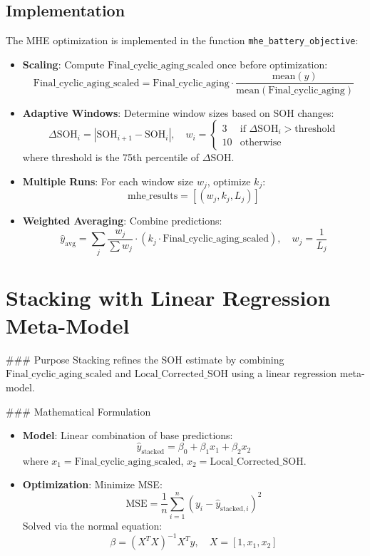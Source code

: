 \subsection{Implementation}
The MHE optimization is implemented in the function \texttt{mhe\_battery\_objective}:
\begin{itemize}
    \item \textbf{Scaling}: Compute \(\text{Final_cyclic_aging_scaled}\) once before optimization:
    \[
    \text{Final_cyclic_aging_scaled} = \text{Final_cyclic_aging} \cdot \frac{\text{mean}(y)}{\text{mean}(\text{Final_cyclic_aging})}
    \]
    \item \textbf{Adaptive Windows}: Determine window sizes based on SOH changes:
    \[
    \Delta \text{SOH}_i = |\text{SOH}_{i+1} - \text{SOH}_i|, \quad w_i = 
    \begin{cases} 
    3 & \text{if } \Delta \text{SOH}_i > \text{threshold} \\
    10 & \text{otherwise}
    \end{cases}
    \]
    where \(\text{threshold}\) is the 75th percentile of \(\Delta \text{SOH}\).
    \item \textbf{Multiple Runs}: For each window size \(w_j\), optimize \(k_j\):
    \[
    \text{mhe\_results} = [(w_j, k_j, L_j)]
    \]
    \item \textbf{Weighted Averaging}: Combine predictions:
    \[
    \hat{y}_{\text{avg}} = \sum_{j} \frac{w_j}{\sum w_j} \cdot (k_j \cdot \text{Final_cyclic_aging_scaled}), \quad w_j = \frac{1}{L_j}
    \]
\end{itemize}

\section{Stacking with Linear Regression Meta-Model}

### Purpose
Stacking refines the SOH estimate by combining \(\text{Final_cyclic_aging_scaled}\) and \(\text{Local_Corrected_SOH}\) using a linear regression meta-model.

### Mathematical Formulation
\begin{itemize}
    \item \textbf{Model}: Linear combination of base predictions:
    \[
    \hat{y}_{\text{stacked}} = \beta_0 + \beta_1 x_1 + \beta_2 x_2
    \]
    where \(x_1 = \text{Final_cyclic_aging_scaled}\), \(x_2 = \text{Local_Corrected_SOH}\).
    \item \textbf{Optimization}: Minimize MSE:
    \[
    \text{MSE} = \frac{1}{n} \sum_{i=1}^{n} (y_i - \hat{y}_{\text{stacked},i})^2
    \]
    Solved via the normal equation:
    \[
    \beta = (X^T X)^{-1} X^T y, \quad X = [1, x_1, x_2]
    \]
\end{itemize}

